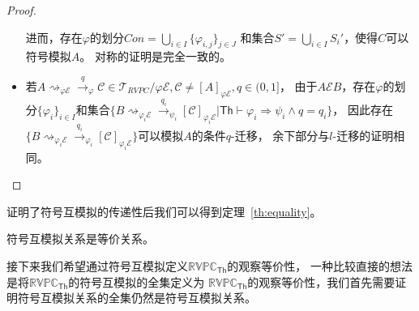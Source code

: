 \begin{proof}
\begin{itemize}
{         进而，存在$\varphi$的划分$Con=\bigcup_{i\in I}\{\varphi_{i,j}\}_{j\in J}$
         和集合$S'=\bigcup_{i\in I}S_i'$，使得$C$可以符号模拟$A$。
         对称的证明是完全一致的。
      }
      \item {
         若$A\rightsquigarrow_{\varphi \mathcal{E}}\stackrel{q}{\rightarrow}_{\varphi} \mathcal{C}\in \mathcal{T}_{RVPC}/\varphi\mathcal{E},\mathcal{C}\neq [A]_{\varphi\mathcal{E}},q\in(0,1]$，
         由于$A\mathcal{E}B$，存在$\varphi$的划分$\{\varphi_i\}_{i\in I}$和集合$\{B\rightsquigarrow_{\varphi_i\mathcal{E}}\stackrel{q_i}{\rightarrow}_{\psi_i} [\mathcal{C}]_{\varphi_i\mathcal{E}}|\mathsf{Th}\vdash \varphi_i\Rightarrow \psi_i\wedge q=q_i\}$，
         因此存在$\{B\rightsquigarrow_{\varphi_i\mathcal{E}}\stackrel{q_i}{\rightarrow}_{\varphi_i} [\mathcal{C}]_{\varphi_i\mathcal{E}}\}$可以模拟$A$的条件$q$-迁移，
         余下部分与$l$-迁移的证明相同。
      }
   \end{itemize}
\end{proof}
证明了符号互模拟的传递性后我们可以得到定理~\ref{th:equality}。
\begin{theorem}\label{th:equality}
   符号互模拟关系是等价关系。
\end{theorem}

接下来我们希望通过符号互模拟定义$\mathbb{RVPC}_{\mathsf{Th}}$的观察等价性，
一种比较直接的想法是将$\mathbb{RVPC}_{\mathsf{Th}}$的符号互模拟的全集定义为
$\mathbb{RVPC}_{\mathsf{Th}}$的观察等价性，我们首先需要证明符号互模拟关系的全集仍然是符号互模拟关系。

